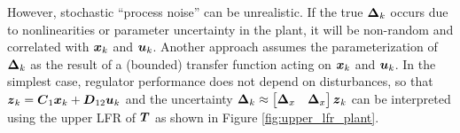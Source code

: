 However, stochastic ``process noise'' can be unrealistic.  If the true $\vb*{\Delta}_{k}$ occurs due to nonlinearities or parameter uncertainty in the plant, it will be non-random \cite{kalman1994randomness} and correlated with $\vb*{x}_{k}$ and $\vb*{u}_{k}$.  Another approach assumes the parameterization of $\vb*{\Delta}_{k}$ as the result of a (bounded) transfer function acting on $\vb*{x}_{k}$ and $\vb*{u}_{k}$.  In the simplest case, regulator performance does not depend on disturbances, so that $\vb*{z}_{k} = \vb*{C}_{1}\vb*{x}_{k} + \vb*{D}_{12}\vb*{u}_{k}$ and the uncertainty $\vb*{\Delta}_{k} \approx \begin{bmatrix} \vb*{\Delta}_{x} & \vb*{\Delta}_{x} \end{bmatrix} \vb*{z}_{k}$ can be interpreted using the upper LFR of $\vb*{T}$ as shown in Figure \ref{fig:upper_lfr_plant}.

